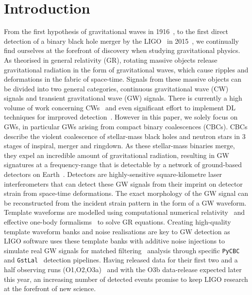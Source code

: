 \documentclass[a4paper]{jpconf}
\begin{document}
\section{Introduction}\label{intro}

From the first hypothesis of gravitational waves in 1916~\cite{einstein1}, to the first direct detection of a binary black hole merger by the \ac{LIGO}~\cite{advancedLIGO} in 2015~\cite{abbott2016observation}, we continually find ourselves at the forefront of discovery when studying gravitational physics. As theorised in general relativity (GR), rotating massive objects release gravitational radiation in the form of gravitational waves, which cause ripples and deformations in the fabric of space-time. Signals from these massive objects can be divided into two general categories, continuous gravitational wave (CW) signals and transient gravitational wave (GW) signals. There is currently a high volume of work concerning CWs~\cite{bayley2019soap} and even significant effort to implement \ac{DL} techniques for imrproved detection~\cite{bayley2020soapML,cwml2019}. However in this paper, we solely focus on GWs, in particular GWs arising from compact binary coalescences (CBCs). CBCs describe the violent coalescence of stellar-mass black holes and neutron stars in 3 stages of inspiral, merger and ringdown. As these stellar-mass binaries merge, they expel an incredible amount of gravitational radiation, resulting in GW signatures at a frequency-range that is detectable by a network of ground-based detectors on Earth~\cite{advancedVIRGO,kagra,UNNIKRISHNAN_2013}. Detectors are highly-sensitive square-kilometre laser interferometers that can detect these GW signals from their imprint on detector strain from space-time deformations. The exact morphology of the GW signal can be reconstructed from the incident strain pattern in the form of a GW waveform. Template waveforms are modelled using computational numerical relativity~\cite{PhysRevLett.95.121101} and effective one-body formalisms~\cite{PhysRevD.59.084006} to solve GR equations. Creating high-quality template waveform banks and noise realisations are key to GW detection as LIGO software uses these template banks with additive noise injections to simulate real GW signals for matched filtering~\cite{PhysRevD.60.022002} analysis through specific \texttt{PyCBC}~\cite{pycbc2016} and \texttt{GstLal}~\cite{gstlal_gen1_2017,gstlal_gen2_2019} detection pipelines. Having released data for their first two and a half observing runs (O1,O2,O3a)~\cite{BBHo1,gwtc1,gwtc2} and with the O3b data-release expected later this year, an increasing number of detected events promise to keep LIGO research at the forefront of new science.
\end{document}
